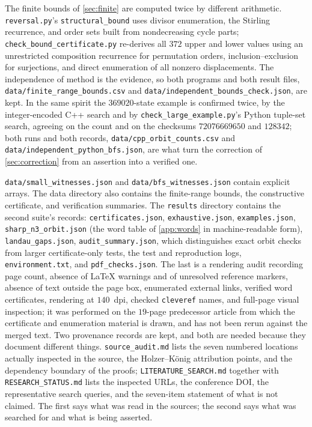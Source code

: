 \documentclass[11pt,a4paper]{article}
\numberwithin{equation}{section}
\theoremstyle{definition}
\theoremstyle{remark}
\begin{document}
\begin{remark}\label{rem:twoarith}
The finite bounds of \cref{sec:finite} are computed twice by different
arithmetic. \texttt{reversal.py}'s \texttt{structural\_bound} uses divisor
enumeration, the Stirling recurrence, and order sets built from nondecreasing
cycle parts; \texttt{check\_bound\_certificate.py} re-derives all $372$ upper
and lower values using an unrestricted composition recurrence for permutation
orders, inclusion--exclusion for surjections, and direct enumeration of all
nonzero displacements. The independence of method is the evidence, so both
programs and both result files, \texttt{data/finite\_range\_bounds.csv} and
\texttt{data/independent\_bounds\_check.json}, are kept. In the same spirit
the $369020$-state example is confirmed twice, by the integer-encoded C++
search and by \texttt{check\_large\_example.py}'s Python tuple-set search,
agreeing on the count and on the checksums $72076669650$ and $128342$; both
runs and both records, \texttt{data/cpp\_orbit\_counts.csv} and
\texttt{data/independent\_python\_bfs.json}, are what turn the correction of
\cref{sec:correction} from an assertion into a verified one.
\end{remark}

\texttt{data/small\_witnesses.json} and
\texttt{data/bfs\_witnesses.json} contain explicit arrays. The data directory
also contains the finite-range bounds, the constructive certificate, and
verification summaries. The \texttt{results} directory contains the second
suite's records: \texttt{certificates.json}, \texttt{exhaustive.json},
\texttt{examples.json}, \texttt{sharp\_n3\_orbit.json} (the word table of
\cref{app:words} in machine-readable form), \texttt{landau\_gaps.json},
\texttt{audit\_summary.json}, which distinguishes exact orbit checks from
larger certificate-only tests, the test and reproduction logs,
\texttt{environment.txt}, and \texttt{pdf\_checks.json}. The last is a
rendering audit recording page count, absence of LaTeX warnings and of
unresolved reference markers, absence of text outside the page box,
enumerated external links, verified word certificates, rendering at
$140$~dpi, checked \texttt{cleveref} names, and full-page visual inspection;
it was performed on the $19$-page predecessor article from which the
certificate and enumeration material is drawn, and has not been rerun against
the merged text. Two provenance records are kept, and both are
needed because they document different things.
\texttt{source\_audit.md} lists the seven numbered locations actually
inspected in the source, the Holzer--K\"onig attribution points, and the
dependency boundary of the proofs; \texttt{LITERATURE\_SEARCH.md} together
with \texttt{RESEARCH\_STATUS.md} lists the inspected URLs, the conference
DOI, the representative search queries, and the seven-item statement of what
is not claimed. The first says what was read in the sources; the second says
what was searched for and what is being asserted.
\end{document}
